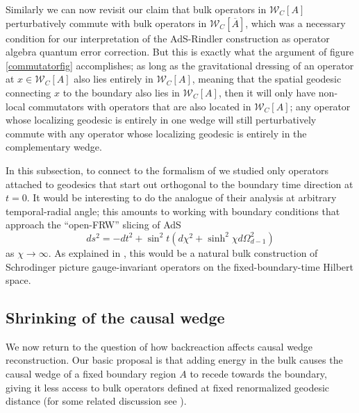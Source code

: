 \documentclass[12pt]{article}
\newcommand{\be}{\begin{equation}}
\newcommand{\ee}{\end{equation}}
\newcommand{\W}{\mathcal{W}}
\newcommand{\ol}{\overline}
\begin{document}
Similarly we can now revisit our claim that bulk operators in $\W_C[A]$ perturbatively commute with bulk operators in $\W_C[\ol{A}]$, which was a necessary condition for our interpretation of the AdS-Rindler construction as operator algebra quantum error correction.  But this is exactly what the argument of figure \ref{commutatorfig} accomplishes; as long as the gravitational dressing of an operator at $x\in \W_C[A]$ also lies entirely in $\W_C[A]$, meaning that the spatial geodesic connecting $x$ to the boundary also lies in $\W_C[A]$, then it will only have non-local commutators with operators that are also located in $\W_C[A]$; any operator whose localizing geodesic is entirely in one wedge will still perturbatively commute with any operator whose localizing geodesic is entirely in the complementary wedge.

In this subsection, to connect to the formalism of \cite{Kabat:2013wga} we studied only operators attached to geodesics that start out orthogonal to the boundary time direction at $t=0$.  It would be interesting to do the analogue of their analysis at arbitrary temporal-radial angle; this amounts to working with boundary conditions that approach the ``open-FRW'' slicing of AdS
\be
ds^2=-dt^2+\sin^2 t \left(d\chi^2+\sinh^2 \chi d\Omega_{d-1}^2\right)  
\ee
as $\chi\to \infty$.  As explained in \cite{Heemskerk:2012mn}, this would be a natural bulk construction of Schrodinger picture gauge-invariant operators on the fixed-boundary-time Hilbert space.

\subsection{Shrinking of the causal wedge}
We now return to the question of how backreaction affects causal wedge reconstruction.  Our basic proposal is that adding energy in the bulk causes the causal wedge of a fixed boundary region $A$ to recede towards the boundary, giving it less access to bulk operators defined at fixed renormalized geodesic distance (for some related discussion see \cite{Wall:2012uf,Hubeny:2012wa,Hubeny:2012ry,Blanco:2013joa,Headrick:2014cta}).  
\end{document}
